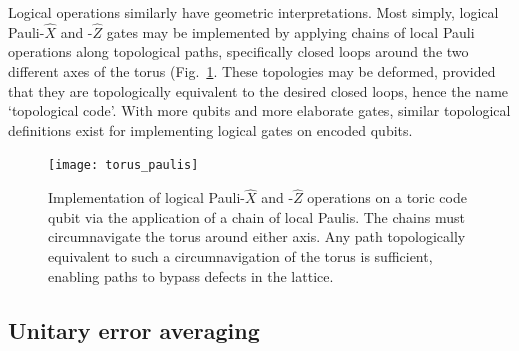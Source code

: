 Logical operations similarly have geometric interpretations. Most simply, logical Pauli-$\hat{X}$ and -$\hat{Z}$ gates may be implemented by applying chains of local Pauli operations along topological paths, specifically closed loops around the two different axes of the torus (Fig.~\ref{fig:toric_code_paulis}. These topologies may be deformed, provided that they are topologically equivalent to the desired closed loops, hence the name `topological code'. With more qubits and more elaborate gates, similar topological definitions exist for implementing logical gates on encoded qubits.

\begin{figure}[!htbp]
	\texttt{[image: torus\_paulis]}
	\captionspacefig \caption{Implementation of logical Pauli-$\hat{X}$ and -$\hat{Z}$ operations on a toric code qubit via the application of a chain of local Paulis. The chains must circumnavigate the torus around either axis. Any path topologically equivalent to such a circumnavigation of the torus is sufficient, enabling paths to bypass defects in the lattice.} \label{fig:toric_code_paulis}
\end{figure}









%
%

\subsection{Unitary error averaging} \label{sec:error_averaging}

